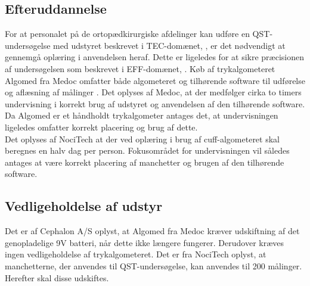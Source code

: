 \subsection{Efteruddannelse}
For at personalet på de ortopædkirurgiske afdelinger kan udføre en QST-undersøgelse med udstyret beskrevet i TEC-domænet, , er det nødvendigt at gennemgå oplæring i anvendelsen heraf. Dette er ligeledes for at sikre præcisionen af undersøgelsen som beskrevet i EFF-domænet, . Køb af trykalgometeret Algomed fra Medoc omfatter både algometeret og tilhørende software til udførelse og aflæsning af målinger \citep{AlgomedData}. Det oplyses af Medoc, at der medfølger cirka to timers undervisning i korrekt brug af udstyret og anvendelsen af den tilhørende software. Da Algomed er et håndholdt trykalgometer antages det, at undervisningen ligeledes omfatter korrekt placering og brug af dette. \\
Det oplyses af NociTech at der ved oplæring i brug af cuff-algometeret skal beregnes en halv dag per person. Fokusområdet for undervisningen vil således antages at være korrekt placering af manchetter og brugen af den tilhørende software.   

\subsection{Vedligeholdelse af udstyr}
Det er af Cephalon A/S oplyst, at Algomed fra Medoc kræver udskiftning af det genopladelige 9V batteri, når dette ikke længere fungerer. Derudover kræves ingen vedligeholdelse af trykalgometeret.
Det er fra NociTech oplyst, at manchetterne, der anvendes til QST-undersøgelse, kan anvendes til 200 målinger. Herefter skal disse udskiftes.

